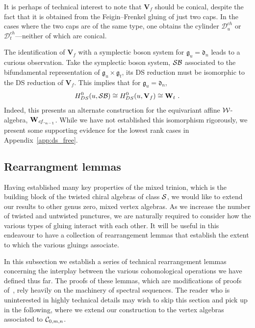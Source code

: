 \documentclass[a4paper]{article}
\def\BB{{\cal B}}
\def\CC{{\cal C}}
\def\SS{{\cal S}}
\def\WW{{\cal W}}
\def\df{\mathfrak{d}}
\def\gf{\mathfrak{g}}
\def \cf{{\it cf.}}
\def\D{\mathcal{D}^{ch}}
\def\W{\mathbf{W}}
\def\V{\mathbf{V}}
\begin{document}
It is perhaps of technical interest to note that $\V_f$ should be conical, despite the fact that it is obtained from the Feigin--Frenkel gluing of just two caps. In the cases where the two caps are of the same type, one obtains the cylinder $\D_u$ or $\D_t$---neither of which are conical.

The identification of $\V_{f}$ with a symplectic boson system for $\gf_u=\mathfrak{d}_n$ leads to a curious observation. Take the symplectic boson system, $\SS\BB$ associated to the bifundamental representation of $\gf_u\times \gf_t$, its DS reduction must be isomorphic to the DS reduction of $\V_f$. This implies that for $\gf_u = \df_n$,
\begin{equation}\label{eq:ds_free}
	H^0_{DS}(u, \SS\BB) \cong H^0_{DS}(u,\V_f)\cong \W_t~.
\end{equation}
Indeed, this presents an alternate construction for the equivariant affine $\WW$-algebra, $\W_{\cf_{n-1}}$. While we have not established this isomorphism rigorously, we present some supporting evidence for the lowest rank cases in Appendix~\ref{app:ds_free}.

\subsection{\label{ssec:duality/rearr}Rearrangment lemmas}

Having established many key properties of the mixed trinion, which is the building block of the twisted chiral algebras of class $\SS$, we would like to extend our results to other genus zero, mixed vertex algebras. As we increase the number of twisted and untwisted punctures, we are naturally required to consider how the various types of gluing interact with each other. It will be useful in this endeavour to have a collection of rearrangement lemmas that establish the extent to which the various gluings associate.

In this subsection we establish a series of technical rearrangement lemmas concerning the interplay between the various cohomological operations we have defined thus far. The proofs of these lemmas, which are modifications of proofs of~\cite{Arakawa:2018egx}, rely heavily on the machinery of spectral sequences. The reader who is uninterested in highly technical details may wish to skip this section and pick up in the following, where we extend our construction to the vertex algebras associated to $\CC_{0,m,n}$.
\end{document}
